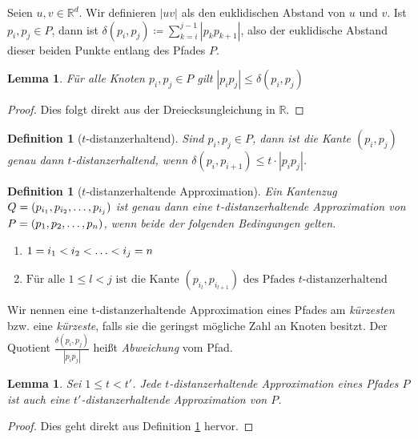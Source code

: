 \documentclass[11pt]{article}
\newcommand{\R}{\mathbb{R}}
\newtheorem{lemma}[theorem]{Lemma}
\newtheorem{definition}[theorem]{Definition}
\begin{document}
    Seien $u, v \in \R^d$. Wir definieren $|uv|$ als den euklidischen Abstand von $u$ und $v$.
    Ist $p_i, p_j \in P$, dann ist $\delta(p_i, p_j) \coloneqq \sum\limits_{k=i}^{j-1}{|p_k
    p_{k+1}|}$, also der euklidische Abstand dieser beiden Punkte entlang des Pfades $P$.
	\begin{lemma}
		\label{lem:triangle}
		Für alle Knoten $p_i, p_j \in P$ gilt $|p_ip_j| \leq \delta(p_i, p_j)$
	\end{lemma}
	\begin{proof}
		Dies folgt direkt aus der Dreiecksungleichung in $\R$.
	\end{proof}
	
	\begin{definition}[$t$-distanzerhaltend]
		\label{def:t-dist}
		Sind $p_i, p_j \in P$, dann ist die Kante $(p_i, p_j)$ genau dann \emph{$t$-distanzerhaltend}, wenn $\delta(p_i, p_{i+1}) \leq t \cdot |p_ip_j|$.
	\end{definition}

	\begin{definition}[$t$-distanzerhaltende Approximation]
		\label{def:t-distapp}
		Ein Kantenzug $Q = (p_{i_1}, p_{i_2}, \mathellipsis, p_{i_j})$ ist genau dann eine \emph{$t$-distanzerhaltende Approximation von $P = (p_1, p_2, \mathellipsis, p_n)$}, wenn beide der folgenden Bedingungen gelten.
		\begin{enumerate}
			\item $\displaystyle 1 = i_1 < i_2 < \mathellipsis < i_j = n$
			\item $\displaystyle \text{Für alle } 1 \leq l < j \text{ ist die Kante } (p_{i_l}, p_{i_{l+1}}) \text{ des Pfades $t$-distanzerhaltend}$
		\end{enumerate}
	\end{definition}
	
	Wir nennen eine t-distanzerhaltende Approximation eines Pfades am \emph{kürzesten} bzw. eine \emph{kürzeste}, falls sie die geringst mögliche Zahl an Knoten besitzt.
	Der Quotient $\frac{\delta(p_i, p_j)}{|p_ip_j|}$ heißt \emph{Abweichung} vom Pfad.
	\begin{lemma}
		\label{lem:approximations}
		Sei $1 \leq t < t'$. Jede $t$-distanzerhaltende Approximation eines Pfades $P$ ist auch eine $t'$-distanzerhaltende Approximation von $P$.
	\end{lemma}
	\begin{proof}
		Dies geht direkt aus Definition \ref{def:t-distapp} hervor.
	\end{proof}
	
\end{document}
